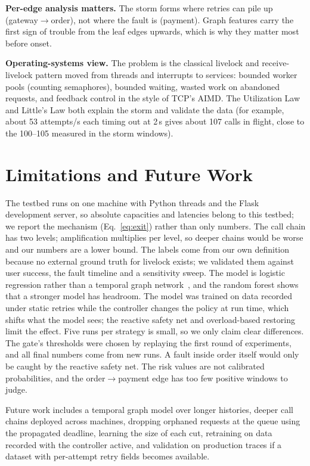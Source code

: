 \documentclass[conference,a4paper]{IEEEtran}
\begin{document}
\textbf{Per-edge analysis matters.} The storm forms where retries can pile up (gateway$\to$order), not where the fault is (payment). Graph features carry the first sign of trouble from the leaf edges upwards, which is why they matter most before onset.

\textbf{Operating-systems view.} The problem is the classical livelock and receive-livelock pattern moved from threads and interrupts to services: bounded worker pools (counting semaphores), bounded waiting, wasted work on abandoned requests, and feedback control in the style of TCP's AIMD. The Utilization Law and Little's Law both explain the storm and validate the data (for example, about 53 attempts/s each timing out at 2\,s gives about 107 calls in flight, close to the 100--105 measured in the storm windows).

\section{Limitations and Future Work}
\label{sec:limits}

The testbed runs on one machine with Python threads and the Flask development server, so absolute capacities and latencies belong to this testbed; we report the mechanism (Eq.~\ref{eq:exit}) rather than only numbers. The call chain has two levels; amplification multiplies per level, so deeper chains would be worse and our numbers are a lower bound. The labels come from our own definition because no external ground truth for livelock exists; we validated them against user success, the fault timeline and a sensitivity sweep. The model is logistic regression rather than a temporal graph network~\cite{tgn2020}, and the random forest shows that a stronger model has headroom. The model was trained on data recorded under static retries while the controller changes the policy at run time, which shifts what the model sees; the reactive safety net and overload-based restoring limit the effect. Five runs per strategy is small, so we only claim clear differences. The gate's thresholds were chosen by replaying the first round of experiments, and all final numbers come from new runs. A fault inside order itself would only be caught by the reactive safety net. The risk values are not calibrated probabilities, and the order$\to$payment edge has too few positive windows to judge.

Future work includes a temporal graph model over longer histories, deeper call chains deployed across machines, dropping orphaned requests at the queue using the propagated deadline, learning the size of each cut, retraining on data recorded with the controller active, and validation on production traces if a dataset with per-attempt retry fields becomes available.
\end{document}
